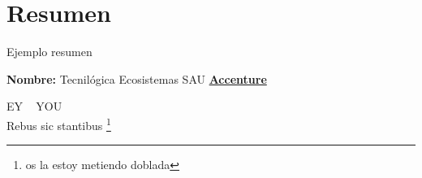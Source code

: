 \section*{Resumen}
Ejemplo resumen

\textbf{Nombre:} Tecnilógica Ecosistemas SAU \href{https://www.accenture.com/es-es/company-tecnilogica-accenture}{\textbf{\color{blue}Accenture}}
\par EY ~\cite{watson53} YOU ~\cite{vmware} \\
Rebus sic stantibus \footnote{os la estoy metiendo doblada}

